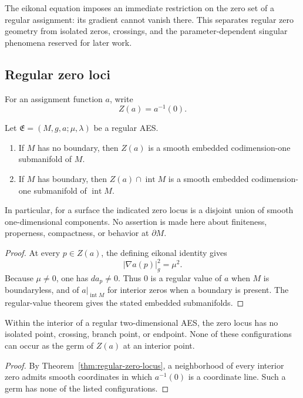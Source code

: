 The eikonal equation imposes an immediate restriction on the zero set of a regular
assignment: its gradient cannot vanish there.  This separates regular zero geometry
from isolated zeros, crossings, and the parameter-dependent singular phenomena
reserved for later work.

\subsection{Regular zero loci}

For an assignment function \(a\), write
\[
 Z(a)=a^{-1}(0).
\]

\begin{theorem}\label{thm:regular-zero-locus}
Let \(\mathfrak E=(M,g,a;\mu,\lambda)\) be a regular AES.
\begin{enumerate}
\item If \(M\) has no boundary, then \(Z(a)\) is a smooth embedded
      codimension-one submanifold of \(M\).
\item If \(M\) has boundary, then
      \(Z(a)\cap\operatorname{int}M\) is a smooth embedded
      codimension-one submanifold of \(\operatorname{int}M\).
\end{enumerate}
In particular, for a surface the indicated zero locus is a disjoint union of
smooth one-dimensional components.  No assertion is made here about finiteness,
properness, compactness, or behavior at \(\partial M\).
\end{theorem}

\begin{proof}
At every \(p\in Z(a)\), the defining eikonal identity gives
\[
 |\nabla a(p)|_g^2=\mu^2.
\]
Because \(\mu\ne0\), one has \(da_p\ne0\).  Thus \(0\) is a regular value of
\(a\) when \(M\) is boundaryless, and of
\(a|_{\operatorname{int}M}\) for interior zeros when a boundary is present.
The regular-value theorem gives the stated embedded submanifolds.
\end{proof}

\begin{corollary}\label{cor:regular-zero-rigidity}
Within the interior of a regular two-dimensional AES, the zero locus has no
isolated point, crossing, branch point, or endpoint.  None of these configurations
can occur as the germ of \(Z(a)\) at an interior point.
\end{corollary}

\begin{proof}
By Theorem~\ref{thm:regular-zero-locus}, a neighborhood of every interior zero
admits smooth coordinates in which \(a^{-1}(0)\) is a coordinate line.  Such a
germ has none of the listed configurations.
\end{proof}

